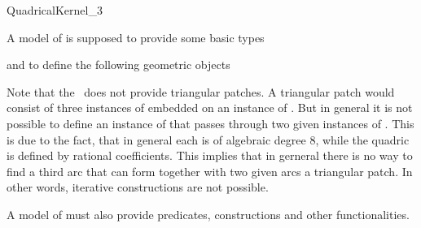 \begin{ccRefConcept}{QuadricalKernel_3}

\ccRefines
{}


\ccTypes

A model of  is supposed to provide some basic types

\ccGlue
{}
\ccGlue
{}



and to define the following geometric objects

\ccGlue
{}
\ccGlue
{}
\ccGlue
{}

Note that the \ccRefName\ does not provide triangular patches. 
A triangular patch would consist of three instances of 
 embedded on an instance of .
But in general it is not possible to define an instance of  that 
passes through two given instances of . 
This is due to the fact, that in general each  is of 
algebraic degree 8, while the quadric is defined by rational coefficients. 
This implies that in gerneral there is no way to find a third arc that can 
form together with two given arcs a triangular patch. 
In other words, iterative constructions are not possible. 

A model of  must also provide predicates, 
constructions and other functionalities. 

\ccPredicates

\ccGlue
{}
\ccGlue
{}
\ccGlue
{}
\ccGlue
{}



\end{ccRefConcept}
